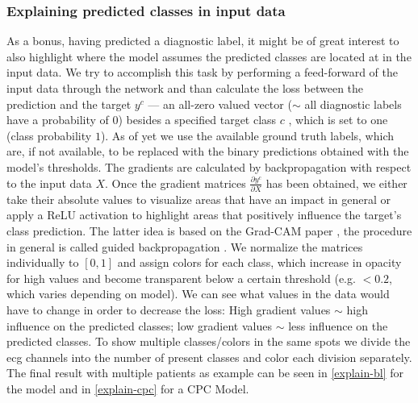 \subsubsection{Explaining predicted classes in input data}\label{sec:explainingclasses}
As a bonus, having predicted a diagnostic label, it might be of great interest to also highlight where the model assumes the predicted classes are located at in the input data. We try to accomplish this task by performing a feed-forward of the input data through the network and than calculate the loss between the prediction and the target $y^c$ --- an all-zero valued vector ($\sim$ all diagnostic labels have a probability of 0) besides a specified target class $c$ , which is set to one (class probability $1$). As of yet we use the available ground truth labels, which are, if not available, to be replaced with the binary predictions obtained with the model's thresholds. The gradients are calculated by backpropagation with respect to the input data $X$. Once the gradient matrices $\frac{\partial y^c}{\partial X}$ has been obtained, we either take their absolute values to visualize areas that have an impact in general or apply a ReLU activation to highlight areas that positively influence the target's class prediction. The latter idea is based on the Grad-CAM paper \autocite{DBLP:journals/corr/SelvarajuDVCPB16}, the procedure in general is called guided backpropagation \autocite{HowtoVisuallyExplainanyCNNbasedModelsbyRenuKhandelwalTowardsDataScience-2022-01-18}. We normalize the matrices individually to $[0, 1]$ and assign colors for each class, which increase in opacity for high values and become transparent below a certain threshold (e.g. $<0.2$, which varies depending on model). We can see what values in the data would have to change in order to decrease the loss: High gradient values $\sim$ high influence on the predicted classes; low gradient values $\sim$ less influence on the predicted classes. To show multiple classes/colors in the same spots we divide the ecg channels into the number of present classes and color each division separately. The final result with multiple patients as example can be seen in \autoref{explain-bl} for the  model and in \autoref{explain-cpc} for a CPC Model. 

